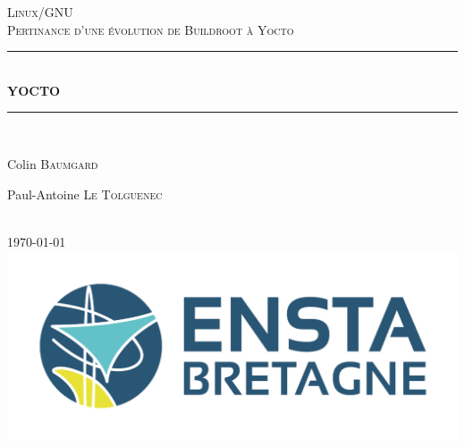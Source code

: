 \documentclass[12pt]{article}
\begin{document}
\begin{titlepage}
\newcommand{\HRule}{\rule{\linewidth}{0.1mm}} 
\center %
 
\textsc{\Large Linux/GNU}\\[0.3cm] %
\textsc{\Large Pertinance d'une évolution de Buildroot à Yocto }\\[0.3cm] %


\HRule \\[0.4cm]
{ \huge \bfseries YOCTO}\\[0.1cm] %
\HRule \\[1.5cm]
 

\begin{minipage}{0.4\textwidth}
\begin{flushleft} \large
Colin \textsc{Baumgard}\\  %
\end{flushleft}

\end{minipage}
\begin{minipage}{0.4\textwidth}
    \begin{flushleft} \large
        Paul-Antoine \textsc{Le Tolguenec}\\  %
        \end{flushleft}

      
\end{minipage}\\[1cm]
{\large \today}\\[1cm] %
\includegraphics{ENSTA1246-524.png}%
\vfill %

\end{titlepage}
\end{document}

